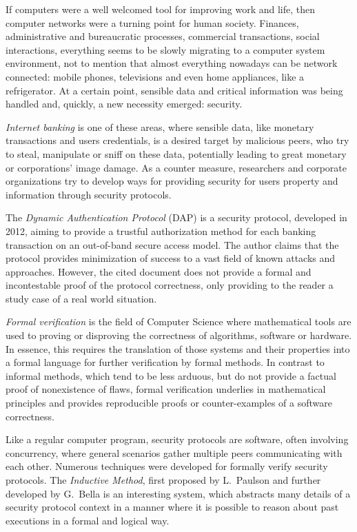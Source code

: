 If computers were a well welcomed tool for improving work and life, then computer networks were a turning point for human society. Finances, administrative and bureaucratic processes, commercial transactions, social interactions, everything seems to be slowly migrating to a computer system environment, not to mention that almost everything nowadays can be network connected: mobile phones, televisions and even home appliances, like a refrigerator. At a certain point, sensible data and critical information was being handled and, quickly, a new necessity emerged: security.

\textit{Internet banking} is one of these areas, where sensible data, like monetary transactions and users credentials, is a desired target by malicious peers, who try to steal, manipulate or sniff on these data, potentially leading to great monetary or corporations' image damage. As a counter measure, researchers and corporate organizations try to develop ways for providing security for users property and information through security protocols.

The \textit{Dynamic Authentication Protocol} (DAP) \cite{Peotta2012} is a security protocol, developed in 2012, aiming to provide a trustful authorization method for each banking transaction on an out-of-band secure access model. The author claims that the protocol provides minimization of success to a vast field of known attacks and approaches. However, the cited document does not provide a formal and incontestable proof of the protocol correctness, only providing to the reader a study case of a real world situation.

\textit{Formal verification} is the field of Computer Science where mathematical tools are used to proving or disproving the correctness of algorithms, software or hardware. In essence, this requires the translation of those systems and their properties into a formal language for further verification by formal methods. In contrast to informal methods, which tend to be less arduous, but do not provide a factual proof of nonexistence of flaws, formal verification underlies in mathematical principles and provides reproducible proofs or counter-examples of a software correctness.

Like a regular computer program, security protocols are software, often involving concurrency, where general scenarios gather multiple peers communicating with each other. Numerous techniques were developed for formally verify security protocols. The \textit{Inductive Method}, first proposed by L.~Paulson \cite{Paulson98} and further developed by G.~Bella \cite{Bella2007} is an interesting system, which abstracts many details of a security protocol context in a manner where it is possible to reason about past executions in a formal and logical way.

